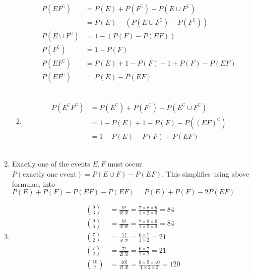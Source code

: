 \begin{enumerate}
\begin{enumerate}
		
			\begin{align}
				P(E F^\complement) &= P(E) + P(F^\complement) - P(E \cup F^\complement) \\
				&= P(E) - (P(E \cup F^\complement) - P(F^\complement)) \\
				P(E \cup F^\complement) &= 1 - (P(F) - P(EF)) \\
				P(F^\complement) &= 1 - P(F) \\
				P(E F^\complement) &= P(E) + 1 - P(F) - 1 +  P(F) - P(EF) \\
				P(E F^\complement) &= P(E) - P(EF)
			\end{align} \\
			\item 
			\begin{align}
				P(E^\complement F^\complement) &= P(E^\complement) + P(F^\complement) - P(E^\complement \cup F^\complement) \\
				&= 1 - P(E) + 1 - P(F) - P((EF)^\complement) \\
				&= 1 - P(E) - P(F) + P(EF)
			\end{align} \\
			
		 
	\end{enumerate} 
	
	\item Exactly one of the events $ E, F $ must occur. \\
	$ P(\text{exactly one event}) = P(E \cup F) - P(EF) $. This simplifies using above formulae, into \\
	$ P(E) + P(F) - P(EF) - P(EF) = P(E) + P(F) - 2P(EF)$ \\
	
	\item 
		\begin{align}
			\binom{9}{3} &= \frac{9!}{6!\ 3!} = \frac{7 \times 8 \times 9}{1 \times 2 \times 3} = 84 \\
			\binom{9}{6} &= \frac{9!}{3!\ 6!} = \frac{7 \times 8 \times 9}{1 \times 2 \times 3} = 84 \\
			\binom{7}{2} &= \frac{7!}{5!\ 2!} = \frac{6 \times 7}{1 \times 2} = 21 \\
			\binom{7}{2} &= \frac{7!}{2!\ 5!} = \frac{6 \times 7}{1 \times 2} = 21 \\
			\binom{10}{7} &= \frac{10!}{7!\ 3!} = \frac{8 \times 9 \times 10}{1 \times 2 \times 3} = 120
		\end{align}
	 \\
	

\end{enumerate}
